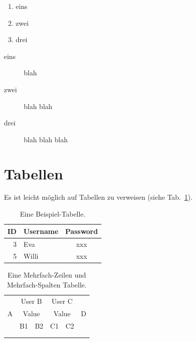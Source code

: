 \begin{appendix}
\begin{enumerate}
  \item eins
  \item zwei
  \item drei
\end{enumerate}


\begin{description}
\item[eins] blah
\item[zwei] blah blah
\item[drei] blah blah blah 
\end{description}

\newpage


\section{Tabellen}

Es ist leicht möglich auf Tabellen zu verweisen (siehe Tab.~\ref{UserTable}).

\begin{table}[htbp]
\begin{center}
\begin{tabular}{|r||l|c|} 
\hline 
ID 	& Username 	& Password 	\\ 
\hline 
\hline
3 	& Eva 		& xxx 		\\ 
\hline
5 	& Willi 	& xxx 		\\ 
\hline
\end{tabular}
\end{center}
\caption{Eine Beispiel-Tabelle.}
\label{UserTable}
\end{table}


\begin{table}[htbp]
\begin{center}
	\begin{tabular}{|c|c|c|c|c|c|}
	\hline
	\multirow{3}{*}{A} & \multicolumn{2}{c|}{User B} & %
	    \multicolumn{2}{c|}{User C} & \multirow{3}{*}{D}\\
	\cline{2-5}
	 & \multicolumn{2}{c|}{Value} & \multicolumn{2}{c|}{Value} & \\
	\cline{2-5}
	 & B1 & B2 & C1 & C2 & \\
	\hline
	 & & & & & \\
	\hline
	 & & & & & \\
	\hline
	\end{tabular}
\end{center}
\caption{Eine Mehrfach-Zeilen und Mehrfach-Spalten Tabelle.}
\end{table}



\end{appendix}
